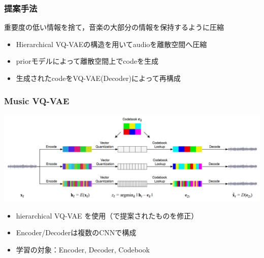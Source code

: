 \documentclass[dvipdfmx]{beamer}
\begin{document}
\begin{frame}
    \frametitle{提案手法}
    重要度の低い情報を捨て，音楽の大部分の情報を保持するように圧縮

    \begin{itemize}
        \item Hierarchical VQ-VAEの構造を用いてaudioを離散空間へ圧縮
        \item priorモデルによって離散空間上でcodeを生成
        \item 生成されたcodeをVQ-VAE(Decoder)によって再構成
    \end{itemize}
\end{frame}


\begin{frame}
    \frametitle{Music VQ-VAE}
    \begin{center}
        \includegraphics[scale=0.2]{figure/musicvqvae.png}
    \end{center}

    \begin{itemize}
        \item hierarchical VQ-VAE を使用（\cite{gdhfiv2}\cite{ndrl}で提案されたものを修正）
        \item Encoder/Decoderは複数のCNNで構成
        \item 学習の対象：Encoder, Decoder, Codebook
    \end{itemize}
\end{frame}
\end{document}

